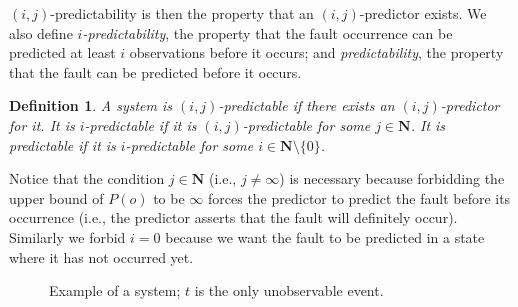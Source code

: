 \documentclass{article}
\newtheorem{defi}{Definition}
\newcommand{\naturals}{\mathbf{N}}
\newcommand{\path}[0]{\mathit{\rho}}
\newcommand{\set}[1]{\{#1\}}
\begin{document}
$(i,j)$-predictability is then the property 
that an $(i,j)$-predictor exists.  
We also define \emph{$i$-predictability}, 
the property that the fault occurrence can be predicted 
at least $i$ observations before it occurs; 
and \emph{predictability}, 
the property that the fault can be predicted before it occurs.  

\begin{defi}\label{defi::predictability}
  A system is \emph{$(i,j)$-predictable} 
  if there exists an $(i,j)$-predictor for it.  
  It is \emph{$i$-predictable} if it is $(i,j)$-predictable 
  for some $j \in \naturals$.  
  It is \emph{predictable} if it is $i$-predictable 
  for some $i \in \naturals \setminus \set{0}$.  
\end{defi}

Notice that the condition $j \in \naturals$ (i.e., $j \neq \infty$) 
is necessary because forbidding the upper bound of $P(o)$ 
to be $\infty$ forces the predictor 
to predict the fault before its occurrence 
(i.e., the predictor asserts that the fault will definitely occur).  
Similarly we forbid $i = 0$ because we want the fault to be predicted 
in a state where it has not occurred yet.  

\begin{figure}[ht]
  \begin{center}
  \end{center}
  \caption{Example of a system; $t$ is the only unobservable event.}
  \label{fig::simple}
\end{figure}
\end{document}
